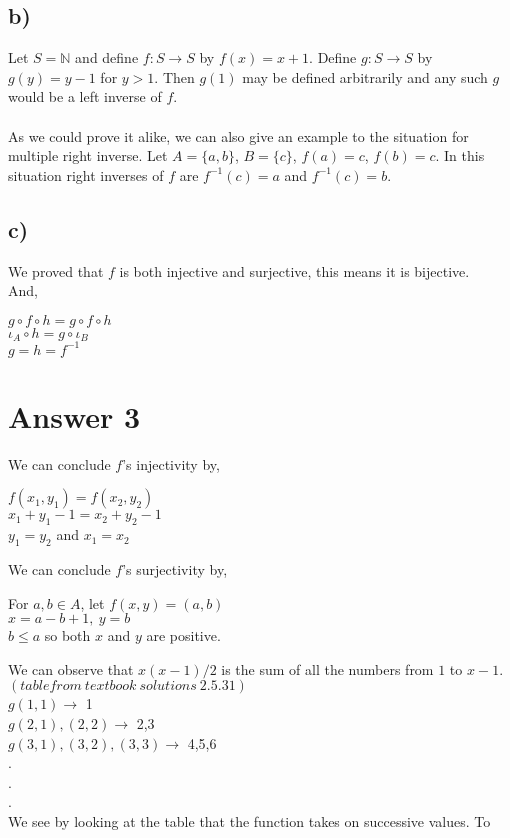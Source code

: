 \documentclass[12pt]{article}
\begin{document}
\subsection*{b)}
Let $S = \mathbb{N}$ and define $f: S \rightarrow S$ by $f(x) = x + 1$. Define $g: S \rightarrow S$ by $g(y) = y - 1$ for $y > 1$. Then $g(1)$ may be defined arbitrarily and any such $g$ would be a left inverse of $f$.\\
\\
As we could prove it alike, we can also give an example to the situation for multiple right inverse. Let $A = \{a, b\}$, $B = \{c\}$, $f(a) = c$, $f(b) = c$. In this situation right inverses of $f$ are $f^{-1}(c) = a$ and $f^{-1}(c) = b$.\\
\subsection*{c)}
We proved that $f$ is both injective and surjective, this means it is bijective.\\
And,
\begin{center}
$g \circ f \circ h = g \circ f \circ h$\\
$\iota_A \circ h = g \circ \iota_B$\\
$g = h = f^{-1}$
\end{center}
\section*{Answer 3}
We can conclude $f$'s injectivity by,
\begin{center}
$f(x_1, y_1) = f(x_2, y_2)$\\
$x_1 + y_1 - 1 = x_2 + y_2 - 1$\\
$y_1 = y_2$ and $x_1 = x_2$
\end{center}
We can conclude $f$'s surjectivity by,
\begin{center}
For $a, b \in A$, let $f(x, y) = (a, b)$\\
$x = a - b + 1,\ y = b$\\
$b \leq a$ so both $x$ and $y$ are positive.
\end{center}
We can observe that $x(x-1)/2$ is the sum of all the numbers from $1$ to $x-1$.\\
$(table from\ textbook\ solutions\ 2.5.31)$\\
$g(1,1) \rightarrow$ 1\\
$g(2,1),(2,2) \rightarrow$ 2,3\\
$g(3,1),(3,2),(3,3) \rightarrow$ 4,5,6\\
.\\
.\\
.\\
We see by looking at the table that the function takes on successive values. To 
\newpage
\end{document}
